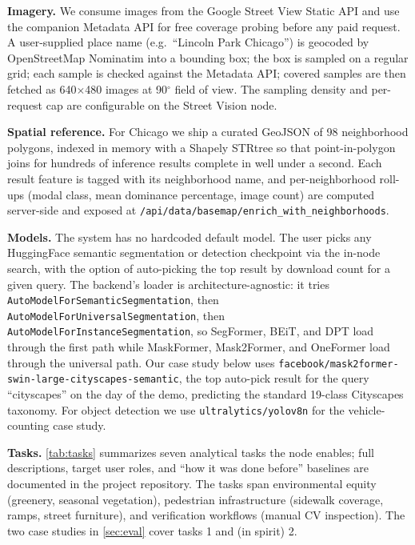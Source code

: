\documentclass[journal]{vgtc}                     %
\begin{document}
\textbf{Imagery.} We consume images from the Google Street View Static API and use the companion Metadata API for free coverage probing before any paid request. A user-supplied place name (e.g.~``Lincoln Park Chicago'') is geocoded by OpenStreetMap Nominatim into a bounding box; the box is sampled on a regular grid; each sample is checked against the Metadata API; covered samples are then fetched as 640$\times$480 images at 90$^{\circ}$ field of view. The sampling density and per-request cap are configurable on the Street Vision node.

\textbf{Spatial reference.} For Chicago we ship a curated GeoJSON of 98 neighborhood polygons, indexed in memory with a Shapely STRtree so that point-in-polygon joins for hundreds of inference results complete in well under a second. Each result feature is tagged with its neighborhood name, and per-neighborhood roll-ups (modal class, mean dominance percentage, image count) are computed server-side and exposed at \texttt{/api/data/basemap/enrich\_with\_neighborhoods}.

\textbf{Models.} The system has no hardcoded default model. The user picks any HuggingFace semantic segmentation or detection checkpoint via the in-node search, with the option of auto-picking the top result by download count for a given query. The backend's loader is architecture-agnostic: it tries \texttt{AutoModelForSemanticSegmentation}, then \texttt{AutoModelForUniversalSegmentation}, then \texttt{AutoModelForInstanceSegmentation}, so SegFormer, BEiT, and DPT load through the first path while MaskFormer, Mask2Former, and OneFormer load through the universal path. Our case study below uses \texttt{facebook/mask2former-swin-large-cityscapes-semantic}, the top auto-pick result for the query ``cityscapes'' on the day of the demo, predicting the standard 19-class Cityscapes taxonomy. For object detection we use \texttt{ultralytics/yolov8n} for the vehicle-counting case study.

\textbf{Tasks.} \autoref{tab:tasks} summarizes seven analytical tasks the node enables; full descriptions, target user roles, and ``how it was done before'' baselines are documented in the project repository. The tasks span environmental equity (greenery, seasonal vegetation), pedestrian infrastructure (sidewalk coverage, ramps, street furniture), and verification workflows (manual CV inspection). The two case studies in \autoref{sec:eval} cover tasks 1 and (in spirit) 2.
\end{document}
